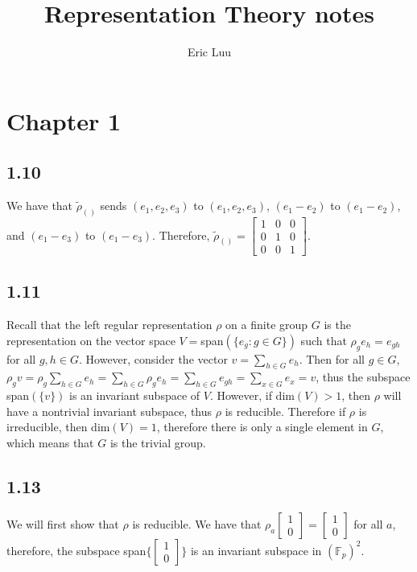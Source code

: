 \documentclass[]{article}
\title{Representation Theory notes}
\author{Eric Luu}
\begin{document}
\maketitle

\section*{Chapter 1}
\subsection*{1.10}
We have that $\tilde{\rho}_{()}$ sends $(e_1, e_2, e_3)$ to $(e_1, e_2, e_3)$, $(e_1 - e_2)$ to $(e_1 - e_2)$, and $(e_1 - e_3)$ to $(e_1 - e_3)$. Therefore, $\tilde{\rho}_{()} = 
\begin{bmatrix}
	1 & 0 & 0\\
	0 & 1 & 0\\
	0 & 0 & 1
\end{bmatrix}
$.
\subsection*{1.11}
Recall that the left regular representation $\rho$ on a finite group $G$ is the representation on the vector space $V=$span$(\lbrace e_g : g \in G \rbrace)$ such that $\rho_g e_h = e_{gh}$ for all $g, h \in G$. However, consider the vector $v = \sum_{h \in G} e_h$. Then for all $g \in G$, $\rho_g v = \rho_g \sum_{h \in G} e_h = \sum_{h \in G} \rho_g e_h = \sum_{h \in G} e_{gh} = \sum_{x \in G} e_x = v$, thus the subspace span$(\lbrace v \rbrace)$ is an invariant subspace of $V$. However, if dim$(V) > 1$, then $\rho$ will have a nontrivial invariant subspace, thus $\rho$ is reducible. Therefore if $\rho$ is irreducible, then dim$(V) = 1$, therefore there is only a single element in $G$, which means that $G$ is the trivial group.
\subsection*{1.13}
We will first show that $\rho$ is reducible. We have that $\rho_a \begin{bmatrix}
	1\\
	0
\end{bmatrix}
= \begin{bmatrix}
	1\\
	0
\end{bmatrix}
$ for all $a$, therefore, the subspace span$\lbrace \begin{bmatrix}
	1\\
	0
\end{bmatrix} \rbrace$ is an invariant subspace in $(\mathbb{F}_p)^2$. 
\end{document}
